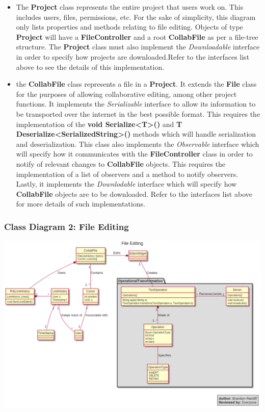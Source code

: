\documentclass[twoside,letterpaper]{article}
\begin{document}
{\begin{itemize}
	\item The \textbf{Project} class represents the entire project that users work on. This includes users, files, permissions, etc. For the sake of simplicity, this diagram only lists properties and methods relating to file editing. Objects of type \textbf{Project} will have a \textbf{FileController} and a root \textbf{CollabFile} as per a file-tree structure. The \textbf{Project} class must also implement the \textit{Downloadable} interface in order to specify how projects are downloaded.Refer to the interfaces list above to see the details of this implementation.
	\item the \textbf{CollabFile} class represents a file in a \textbf{Project}. It extends the \textbf{File} class for the purposes of allowing collaborative editing, among other project functions. It implements the \textit{Serializable} interface to allow its information to be transported over the internet in the best possible format. This requires the implementation of the \textbf{void Serialize<T>()} and \textbf{T Deserialize<SerializedString>()} methods which will handle serialization and deserialization. This class also implements the \textit{Observable} interface which will specify how it communicates with the \textbf{FileController} class in order to notify of relevant changes to \textbf{CollabFile} objects. This requires the implementation of a list of observers and a method to notify observers. Lastly, it implements the \textit{Downlodable} interface which will specify how \textbf{CollabFile} objects are to be downloaded. Refer to the interfaces list above for more details of such implementations.
\end{itemize}

\subsubsection[Class Diagram 2: File Editing]{\rmfamily\bfseries\color{black}
	Class Diagram 2: File Editing}
\hypertarget{RefHeading22059017292}{}
\bigskip

\includegraphics[width=\textwidth]{images/ClassDiagrams/EditFile}

}
\end{document}
